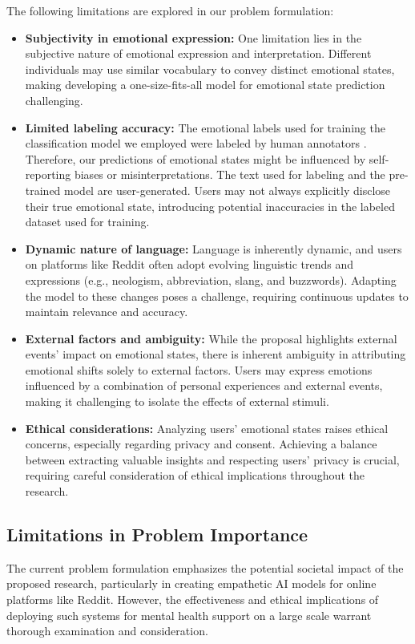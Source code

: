 \documentclass[conference,compsoc]{IEEEtran}
\begin{document}
The following limitations are explored in our problem formulation:
\begin{itemize}
    \item \textbf{Subjectivity in emotional expression:}  One limitation lies in the subjective nature of emotional expression and interpretation. Different individuals may use similar vocabulary to convey distinct emotional states, making developing a one-size-fits-all model for emotional state prediction challenging.
    \item \textbf{Limited labeling accuracy:} The emotional labels used for training the classification model we employed were labeled by human annotators \citep{Demszky+20:GoEmotions}. Therefore, our predictions of emotional states might be influenced by self-reporting biases or misinterpretations. The text used for labeling and the pre-trained model are user-generated. Users may not always explicitly disclose their true emotional state, introducing potential inaccuracies in the labeled dataset used for training.
    \item \textbf{Dynamic nature of language:} Language is inherently dynamic, and users on platforms like Reddit often adopt evolving linguistic trends and expressions (e.g., neologism, abbreviation, slang, and buzzwords). Adapting the model to these changes poses a challenge, requiring continuous updates to maintain relevance and accuracy.
    \item \textbf{External factors and ambiguity:} While the proposal highlights external events' impact on emotional states, there is inherent ambiguity in attributing emotional shifts solely to external factors. Users may express emotions influenced by a combination of personal experiences and external events, making it challenging to isolate the effects of external stimuli.
    \item \textbf{Ethical considerations:} Analyzing users' emotional states raises ethical concerns, especially regarding privacy and consent. Achieving a balance between extracting valuable insights and respecting users' privacy is crucial, requiring careful consideration of ethical implications throughout the research.
\end{itemize}

\subsection{Limitations in Problem Importance}
The current problem formulation emphasizes the potential societal impact of the proposed research, particularly in creating empathetic AI models for online platforms like Reddit. However, the effectiveness and ethical implications of deploying such systems for mental health support on a large scale warrant thorough examination and consideration.
\end{document}
